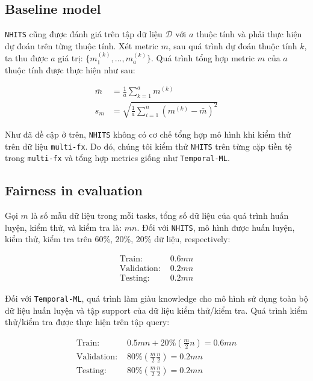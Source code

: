 \subsection{Baseline model}

\verb|NHITS| cũng được đánh giá trên tập dữ liệu $\mathcal{D}$ với $a$ thuộc tính và phải thực hiện dự đoán trên từng thuộc tính. Xét metric $m$, sau quá trình dự đoán thuộc tính $k$, ta thu được $a$ giá trị: $\{m^{(k)}_1,\dots,m^{(k)}_a\}$. Quá trình tổng hợp metric $m$ của $a$ thuộc tính được thực hiện như sau:

\begin{align*}
    \bar{m} &= \frac{1}{a}\sum_{k=1}^a{m^{(k)}}\\
    s_m &= \sqrt{\frac{1}{a} \sum_{i=1}^n{(m^{(k)} - \bar{m})^2}}
\end{align*}

Như đã đề cập ở trên, \verb|NHITS| không có cơ chế tổng hợp mô hình khi kiểm thử trên dữ liệu \verb|multi-fx|. Do đó, chúng tôi kiểm thử \verb|NHITS| trên từng cặp tiền tệ trong \verb|multi-fx| và tổng hợp metrics giống như \verb|Temporal-ML|.

\subsection{Fairness in evaluation}

Gọi $m$ là số mẫu dữ liệu trong mỗi tasks, tổng số dữ liệu của quá trình huấn luyện, kiểm thử, và kiểm tra là: $mn$. Đối với \verb|NHITS|, mô hình được huấn luyện, kiểm thử, kiểm tra trên 60\%, 20\%, 20\% dữ liệu, respectively:

\begin{align*}
    \text{Train: } &0.6mn\\
    \text{Validation: } &0.2mn\\
    \text{Testing: } &0.2mn
\end{align*}

Đối với \verb|Temporal-ML|, quá trình làm giàu knowledge cho mô hình sử dụng toàn bộ dữ liệu huấn luyện và tập support của dữ liệu kiểm thử/kiểm tra. Quá trình kiểm thử/kiểm tra được thực hiện trên tập query:

\begin{align*}
    \text{Train: } &0.5mn + 20\%\left( \frac{m}{2}n \right) = 0.6mn\\
    \text{Validation: } &80\% \left( \frac{m}{2}\frac{n}{2} \right)  =0.2mn\\
    \text{Testing: } &80\% \left( \frac{m}{2}\frac{n}{2} \right) =0.2mn
\end{align*}

